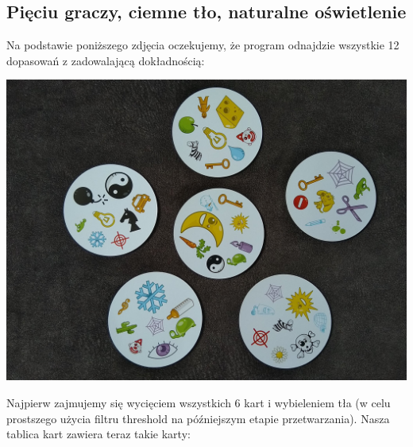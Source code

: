 \documentclass[10pt,a4paper]{article}
\begin{document}
\subsection{Pięciu graczy, ciemne tło, naturalne oświetlenie}
Na podstawie poniższego zdjęcia oczekujemy, że program odnajdzie wszystkie 12 dopasowań z zadowalającą dokładnością:\\
\begin{center}
\includegraphics[scale=0.25]{2.1/dobble04.jpg}
\end{center}
Najpierw zajmujemy się wycięciem wszystkich 6 kart i wybieleniem tła (w celu prostszego użycia filtru threshold na późniejszym etapie przetwarzania). Nasza tablica kart zawiera teraz takie karty:\\
\end{document}
